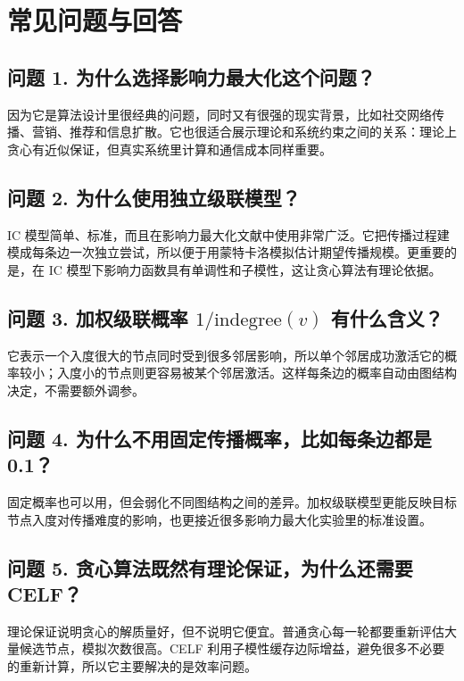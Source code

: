 \documentclass[11pt]{ctexart}
\begin{document}
\section*{常见问题与回答}

\subsection*{问题 1. 为什么选择影响力最大化这个问题？}

因为它是算法设计里很经典的问题，同时又有很强的现实背景，比如社交网络传播、营销、推荐和信息扩散。它也很适合展示理论和系统约束之间的关系：理论上贪心有近似保证，但真实系统里计算和通信成本同样重要。

\subsection*{问题 2. 为什么使用独立级联模型？}

IC 模型简单、标准，而且在影响力最大化文献中使用非常广泛。它把传播过程建模成每条边一次独立尝试，所以便于用蒙特卡洛模拟估计期望传播规模。更重要的是，在 IC 模型下影响力函数具有单调性和子模性，这让贪心算法有理论依据。

\subsection*{问题 3. 加权级联概率 $1/\mathrm{indegree}(v)$ 有什么含义？}

它表示一个入度很大的节点同时受到很多邻居影响，所以单个邻居成功激活它的概率较小；入度小的节点则更容易被某个邻居激活。这样每条边的概率自动由图结构决定，不需要额外调参。

\subsection*{问题 4. 为什么不用固定传播概率，比如每条边都是 0.1？}

固定概率也可以用，但会弱化不同图结构之间的差异。加权级联模型更能反映目标节点入度对传播难度的影响，也更接近很多影响力最大化实验里的标准设置。

\subsection*{问题 5. 贪心算法既然有理论保证，为什么还需要 CELF？}

理论保证说明贪心的解质量好，但不说明它便宜。普通贪心每一轮都要重新评估大量候选节点，模拟次数很高。CELF 利用子模性缓存边际增益，避免很多不必要的重新计算，所以它主要解决的是效率问题。
\end{document}
